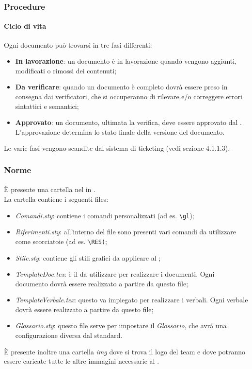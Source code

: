 \subsubsection{Procedure}
	\paragraph{Ciclo di vita}
	Ogni documento può trovarsi in tre fasi differenti:
	\begin{itemize}
		\item \textbf{In lavorazione}: un documento è in lavorazione quando vengono aggiunti, modificati o rimossi dei contenuti;
		\item \textbf{Da verificare}: quando un documento è completo dovrà essere preso in consegna dai verificatori, che si occuperanno di rilevare e/o correggere errori sintattici e semantici;
		\item \textbf{Approvato}: un documento, ultimata la verifica, deve essere approvato dal \RES. L'approvazione determina lo stato finale della versione del documento.
	\end{itemize}
	Le varie fasi vengono scandite dal sistema di ticketing (vedi sezione 4.1.1.3).
\subsubsection{Norme}
	\paragraph{}
	È presente una cartella nel  in . \\
	La cartella contiene i seguenti files:
	\begin{itemize}
		\item \textit{Comandi.sty}: contiene i comandi personalizzati (ad es. \texttt {\textbackslash gl});
		\item \textit{Riferimenti.sty}: all'interno del file sono presenti vari comandi da utilizzare come scorciatoie (ad es. \texttt{\textbackslash RES)};
		\item \textit{Stile.sty}: contiene gli stili grafici da applicare al ;
		\item \textit{TemplateDoc.tex}: è il  da utilizzare per realizzare i documenti. Ogni documento dovrà essere realizzato a partire da questo file;
		\item \textit{TemplateVerbale.tex}: questo  va impiegato per realizzare i verbali. Ogni verbale dovrà essere realizzato a partire da questo file;
		\item \textit{Glossario.sty}: questo file serve per impostare il \textit{Glossario}, che avrà una configurazione diversa dal  standard. %
	\end{itemize}
	È presente inoltre una cartella \textit{img} dove si trova il logo del team e dove potranno essere caricate tutte le altre immagini necessarie al . 
